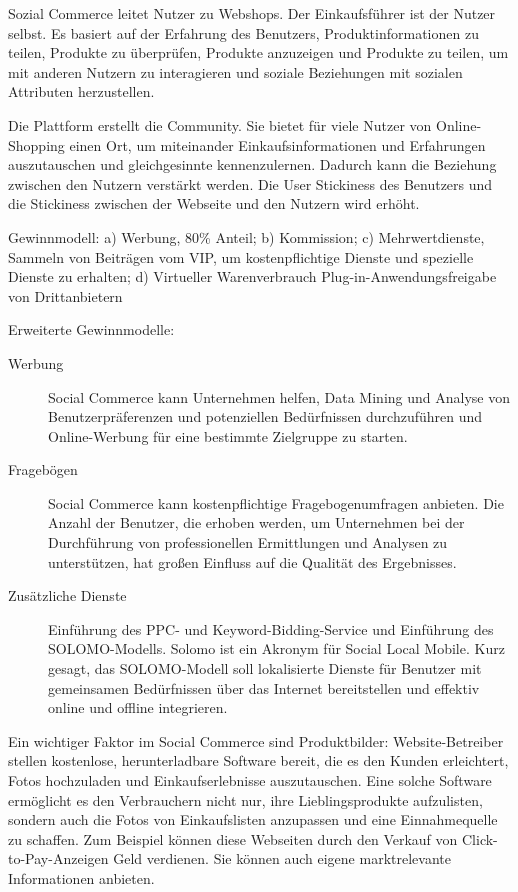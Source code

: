 Sozial Commerce leitet Nutzer zu Webshops. Der Einkaufsführer ist der Nutzer selbst. Es basiert auf der Erfahrung des Benutzers, Produktinformationen zu teilen, Produkte zu überprüfen, Produkte anzuzeigen und Produkte zu teilen, um mit anderen Nutzern zu interagieren und soziale Beziehungen mit sozialen Attributen herzustellen.

Die Plattform erstellt die Community. Sie bietet für viele Nutzer von Online-Shopping einen Ort, um miteinander Einkaufsinformationen und Erfahrungen auszutauschen und gleichgesinnte kennenzulernen. Dadurch kann die Beziehung zwischen den Nutzern verstärkt werden. Die User Stickiness des Benutzers und die Stickiness zwischen der Webseite und den Nutzern wird erhöht.

Gewinnmodell: a) Werbung, 80\% Anteil; b) Kommission; c)  Mehrwertdienste, Sammeln von Beiträgen vom VIP, um kostenpflichtige Dienste und spezielle Dienste zu erhalten; d)  Virtueller Warenverbrauch Plug-in-Anwendungsfreigabe von Drittanbietern

Erweiterte Gewinnmodelle:

\begin{description}
\item[Werbung] Social Commerce kann Unternehmen helfen, Data Mining und Analyse von Benutzerpräferenzen und potenziellen Bedürfnissen durchzuführen und Online-Werbung für eine bestimmte Zielgruppe zu starten.
\item[Fragebögen] Social Commerce kann kostenpflichtige Fragebogenumfragen anbieten. Die Anzahl der Benutzer, die erhoben werden, um Unternehmen bei der Durchführung von professionellen Ermittlungen und Analysen zu unterstützen, hat großen Einfluss auf die Qualität des Ergebnisses.
\item[Zusätzliche Dienste] Einführung des PPC- und Keyword-Bidding-Service und Einführung des SOLOMO-Modells. Solomo ist ein Akronym für Social Local Mobile. Kurz gesagt, das SOLOMO-Modell soll lokalisierte Dienste für Benutzer mit gemeinsamen Bedürfnissen über das Internet bereitstellen und effektiv online und offline integrieren.
\end{description}

Ein wichtiger Faktor im Social Commerce sind Produktbilder: Website-Betreiber stellen kostenlose, herunterladbare Software bereit, die es den Kunden erleichtert, Fotos hochzuladen und Einkaufserlebnisse auszutauschen. Eine solche Software ermöglicht es den Verbrauchern nicht nur, ihre Lieblingsprodukte aufzulisten, sondern auch die Fotos von Einkaufslisten anzupassen und eine Einnahmequelle zu schaffen. Zum Beispiel können diese Webseiten durch den Verkauf von Click-to-Pay-Anzeigen Geld verdienen. Sie können auch eigene marktrelevante Informationen anbieten.


